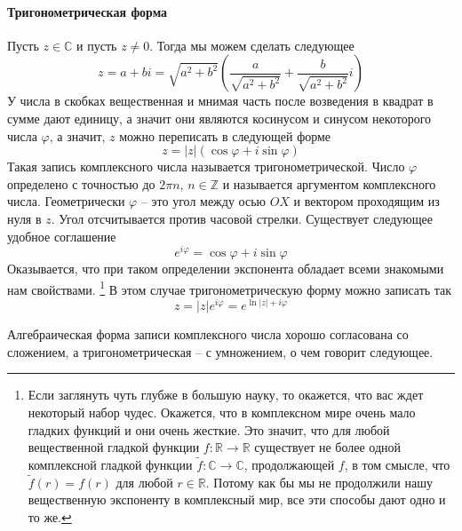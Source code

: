 \paragraph{Тригонометрическая форма}

Пусть $z\in\mathbb C$ и пусть $z\neq 0$.
Тогда мы можем сделать следующее
\[
z = a + bi = \sqrt{a^2 + b^2}\left(\frac{a}{\sqrt{a^2 + b^2}} + \frac{b}{\sqrt{a^2 + b^2}}i\right)
\]
У числа в скобках вещественная и мнимая часть после возведения в квадрат в сумме дают единицу, а значит они являются косинусом и синусом некоторого числа $\varphi$, а значит, $z$ можно переписать в следующей форме
\[
z = |z| (\cos \varphi + i\sin\varphi)
\]
Такая запись комплексного числа называется тригонометрической.
Число $\varphi$ определено с точностью до $2\pi n$, $n\in\mathbb Z$ и называется аргументом комплексного числа.
Геометрически $\varphi$ -- это угол между осью $OX$ и вектором проходящим из нуля в $z$.
Угол отсчитывается против часовой стрелки.
Существует следующее удобное соглашение
\[
e^{i\varphi} = \cos \varphi + i \sin \varphi
\]
Оказывается, что при таком определении экспонента обладает всеми знакомыми нам свойствами.%
\footnote{Если заглянуть чуть глубже в большую науку, то окажется, что вас ждет некоторый набор чудес.
Окажется, что в комплексном мире очень мало гладких функций и они очень жесткие.
Это значит, что для любой вещественной гладкой функции $f\colon \mathbb R\to \mathbb R$ существует не более одной комплексной гладкой функции $\tilde f\colon \mathbb C\to \mathbb C$, продолжающей $f$, в том смысле, что $\tilde f(r) = f(r)$ для любой $r\in \mathbb R$.
Потому как бы мы не продолжили нашу вещественную экспоненту в комплексный мир, все эти способы дают одно и то же.}
В этом случае тригонометрическую форму можно записать так
\[
z = |z| e^{i\varphi} = e^{\ln |z| + i\varphi}
\]

Алгебраическая форма записи комплексного числа хорошо согласована со сложением, а тригонометрическая -- с умножением, о чем говорит следующее.

